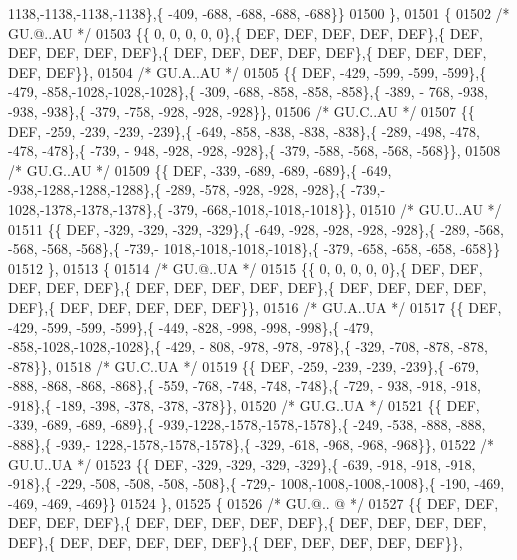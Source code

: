 \begin{DoxyCode}
      1138,-1138,-1138,-1138\},\{ -409, -688, -688, -688, -688\}\}
01500 \},
01501 \{
01502 \textcolor{comment}{/* GU.@..AU */}
01503 \{\{    0,    0,    0,    0,    0\},\{  DEF,  DEF,  DEF,  DEF,  DEF\},\{  DEF,  DEF,  DEF,  DEF,  DEF\},\{  DEF,  
      DEF,  DEF,  DEF,  DEF\},\{  DEF,  DEF,  DEF,  DEF,  DEF\}\},
01504 \textcolor{comment}{/* GU.A..AU */}
01505 \{\{  DEF, -429, -599, -599, -599\},\{ -479, -858,-1028,-1028,-1028\},\{ -309, -688, -858, -858, -858\},\{ -389, -
      768, -938, -938, -938\},\{ -379, -758, -928, -928, -928\}\},
01506 \textcolor{comment}{/* GU.C..AU */}
01507 \{\{  DEF, -259, -239, -239, -239\},\{ -649, -858, -838, -838, -838\},\{ -289, -498, -478, -478, -478\},\{ -739, -
      948, -928, -928, -928\},\{ -379, -588, -568, -568, -568\}\},
01508 \textcolor{comment}{/* GU.G..AU */}
01509 \{\{  DEF, -339, -689, -689, -689\},\{ -649, -938,-1288,-1288,-1288\},\{ -289, -578, -928, -928, -928\},\{ -739,-
      1028,-1378,-1378,-1378\},\{ -379, -668,-1018,-1018,-1018\}\},
01510 \textcolor{comment}{/* GU.U..AU */}
01511 \{\{  DEF, -329, -329, -329, -329\},\{ -649, -928, -928, -928, -928\},\{ -289, -568, -568, -568, -568\},\{ -739,-
      1018,-1018,-1018,-1018\},\{ -379, -658, -658, -658, -658\}\}
01512 \},
01513 \{
01514 \textcolor{comment}{/* GU.@..UA */}
01515 \{\{    0,    0,    0,    0,    0\},\{  DEF,  DEF,  DEF,  DEF,  DEF\},\{  DEF,  DEF,  DEF,  DEF,  DEF\},\{  DEF,  
      DEF,  DEF,  DEF,  DEF\},\{  DEF,  DEF,  DEF,  DEF,  DEF\}\},
01516 \textcolor{comment}{/* GU.A..UA */}
01517 \{\{  DEF, -429, -599, -599, -599\},\{ -449, -828, -998, -998, -998\},\{ -479, -858,-1028,-1028,-1028\},\{ -429, -
      808, -978, -978, -978\},\{ -329, -708, -878, -878, -878\}\},
01518 \textcolor{comment}{/* GU.C..UA */}
01519 \{\{  DEF, -259, -239, -239, -239\},\{ -679, -888, -868, -868, -868\},\{ -559, -768, -748, -748, -748\},\{ -729, -
      938, -918, -918, -918\},\{ -189, -398, -378, -378, -378\}\},
01520 \textcolor{comment}{/* GU.G..UA */}
01521 \{\{  DEF, -339, -689, -689, -689\},\{ -939,-1228,-1578,-1578,-1578\},\{ -249, -538, -888, -888, -888\},\{ -939,-
      1228,-1578,-1578,-1578\},\{ -329, -618, -968, -968, -968\}\},
01522 \textcolor{comment}{/* GU.U..UA */}
01523 \{\{  DEF, -329, -329, -329, -329\},\{ -639, -918, -918, -918, -918\},\{ -229, -508, -508, -508, -508\},\{ -729,-
      1008,-1008,-1008,-1008\},\{ -190, -469, -469, -469, -469\}\}
01524 \},
01525 \{
01526 \textcolor{comment}{/* GU.@.. @ */}
01527 \{\{  DEF,  DEF,  DEF,  DEF,  DEF\},\{  DEF,  DEF,  DEF,  DEF,  DEF\},\{  DEF,  DEF,  DEF,  DEF,  DEF\},\{  DEF,  
      DEF,  DEF,  DEF,  DEF\},\{  DEF,  DEF,  DEF,  DEF,  DEF\}\},

\end{DoxyCode}
